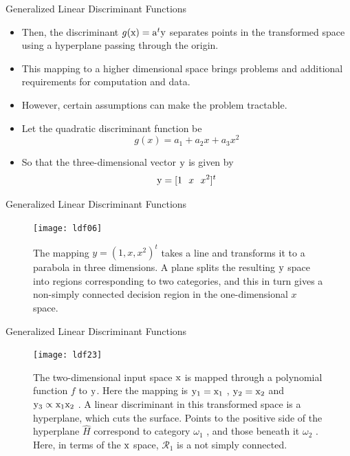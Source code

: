 \begin{frame}{Generalized Linear Discriminant Functions}
\begin{itemize}
\item Then, the discriminant $g({\rm x}) = {\rm a}^t {\rm y}$ separates points in the transformed space using a hyperplane passing through the origin.
\item This mapping to a higher dimensional space brings problems and additional requirements for computation and data.
\item However, certain assumptions can make the problem tractable.
\item Let the quadratic discriminant function be
\begin{equation}
g(x)=a_1+a_2x+a_3x^2 \nonumber
\end{equation}
\item So that the three-dimensional vector ${\rm y}$ is given by
\begin{equation}
{\rm y}=[1~~x~~x^2]^t \nonumber
\end{equation}
\end{itemize}
\end{frame}

\begin{frame}{Generalized Linear Discriminant Functions}
\begin{figure}
\texttt{[image: ldf06]}
\caption{The mapping $y = (1, x, x^2 )^t$ takes a line and transforms it to a parabola
in three dimensions. A plane splits the resulting ${\rm y}$ space into regions corresponding
to two categories, and this in turn gives a non-simply connected decision region in the
one-dimensional $x$ space.}
\end{figure}
\end{frame}

\begin{frame}{Generalized Linear Discriminant Functions}
\begin{figure}
\texttt{[image: ldf23]}
\caption{The two-dimensional input space ${\rm x}$ is mapped through a polynomial
function $f$ to ${\rm y}$. Here the mapping is ${\rm y}_1 = {\rm x}_1$ , ${\rm y}_2 = {\rm x}_2$ and ${\rm y}_3\propto {\rm x}_1 {\rm x}_2$ . A linear
discriminant in this transformed space is a hyperplane, which cuts the surface. Points to the positive side of the hyperplane $\hat{H}$ correspond to category $\omega_1$ , and those beneath
it $\omega_2$ . Here, in terms of the ${\rm x}$ space, $\mathcal{R}_1$ is a not simply connected.}
\end{figure}
\end{frame}


